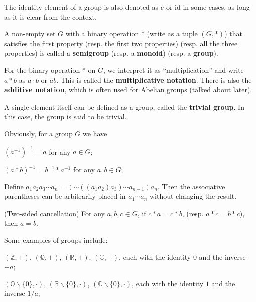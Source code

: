 \documentclass{article}
\begin{document}
\begin{Rmk}{}
    \begin{compactenum}
        \item \textcolor{Df}{The identity element of a group is also denoted as $e$ or $\mathrm{id}$ in some cases, as long as it is clear from the context.}
        \item \textcolor{Df}{A non-empty set $G$ with a binary operation $*$ (write as a tuple $(G, \ast)$) that satisfies the first property (resp. the first two properties) (resp. all the three properties) is called a \textbf{semigroup} (resp. a \textbf{monoid}) (resp. a \textbf{group}).}
        \item \textcolor{Df}{For the binary operation $*$ on $G$, we interpret it as ``multiplication'' and write $a*b$ as $a\cdot b$ or $ab$. This is called the \textbf{multiplicative notation}. There is also the \textbf{additive notation}, which is often used for Abelian groups (talked about later).}
        \item \textcolor{Th}{A single element itself can be defined as a group}, \textcolor{Df}{called the \textbf{trivial group}. In this case, the group is said to be trivial.}
        \item \textcolor{Th}{Obviously, for a group $G$ we have
        \begin{compactenum}
            \item $(a^{-1})^{-1}=a$ for any $a\in G$;
            \item $(a*b)^{-1}=b^{-1}*a^{-1}$ for any $a, b\in G$;
            \item Define $a_1a_2a_3\cdots a_n = (\cdots ((a_1a_2)a_3)\cdots a_{n-1})a_n$. Then the associative parentheses can be arbitrarily placed in $a_1\cdots a_n$ without changing the result.
            \item (Two-sided cancellation) For any $a, b, c\in G$, if $c*a=c*b$, (resp. $a*c=b*c$), then $a=b$.
        \end{compactenum}}
        \item \textcolor{Th}{Some examples of groups include:
        \begin{compactenum}
            \item $(\mathbb{Z}, +)$, $(\mathbb{Q}, +)$, $(\mathbb{R}, +)$, $(\mathbb{C}, +)$, each with the identity $0$ and the inverse $-a$;
            \item $(\mathbb{Q}\backslash\{0\}, \cdot)$, $(\mathbb{R}\backslash\{0\}, \cdot)$, $(\mathbb{C}\backslash\{0\}, \cdot)$, each with the identity $1$ and the inverse $1/a$;

\end{compactenum}}
\end{compactenum}
\end{Rmk}
\end{document}
